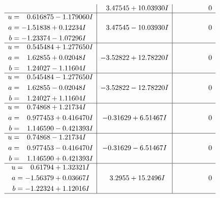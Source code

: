 \documentclass[1p]{elsarticle_modified}
\theoremstyle{definition}
\begin{document}
$$\begin{array}{c|c|c}
 & \phantom{-}3.47545 + 10.03930 I & \phantom{-0.000000 } 0 \\ \hline\begin{aligned}
u &= \phantom{-}0.616875 - 1.179060 I \\
a &= -1.51838 + 0.12234 I \\
b &= -1.23374 - 1.07296 I\end{aligned}
 & \phantom{-}3.47545 - 10.03930 I & \phantom{-0.000000 } 0 \\ \hline\begin{aligned}
u &= \phantom{-}0.545484 + 1.277650 I \\
a &= \phantom{-}1.62855 + 0.02048 I \\
b &= \phantom{-}1.24027 - 1.11604 I\end{aligned}
 & -3.52822 + 12.78220 I & \phantom{-0.000000 } 0 \\ \hline\begin{aligned}
u &= \phantom{-}0.545484 - 1.277650 I \\
a &= \phantom{-}1.62855 - 0.02048 I \\
b &= \phantom{-}1.24027 + 1.11604 I\end{aligned}
 & -3.52822 - 12.78220 I & \phantom{-0.000000 } 0 \\ \hline\begin{aligned}
u &= \phantom{-}0.74868 + 1.21734 I \\
a &= \phantom{-}0.977453 + 0.416470 I \\
b &= \phantom{-}1.146590 - 0.421393 I\end{aligned}
 & -0.31629 + 6.51467 I & \phantom{-0.000000 } 0 \\ \hline\begin{aligned}
u &= \phantom{-}0.74868 - 1.21734 I \\
a &= \phantom{-}0.977453 - 0.416470 I \\
b &= \phantom{-}1.146590 + 0.421393 I\end{aligned}
 & -0.31629 - 6.51467 I & \phantom{-0.000000 } 0 \\ \hline\begin{aligned}
u &= \phantom{-}0.61794 + 1.32321 I \\
a &= -1.56379 + 0.03667 I \\
b &= -1.22324 + 1.12016 I\end{aligned}
 & \phantom{-}3.2955 + 15.2496 I & \phantom{-0.000000 } 0\\
 \hline 
 \end{array}$$\newpage$$\begin{array}{c|c|c}  

\end{array}$$
\end{document}
